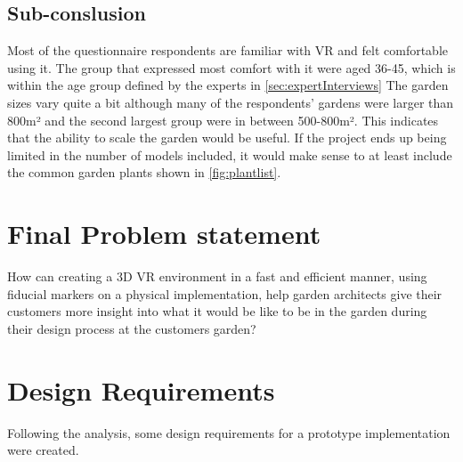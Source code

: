 	\subsection{Sub-conslusion}
	Most of the questionnaire respondents are familiar with VR and felt comfortable using it. The group that expressed most comfort with it were aged 36-45, which is within the age group defined by the experts in \autoref{sec:expertInterviews}
	The garden sizes vary quite a bit although many of the respondents' gardens were larger than 800m² and the second largest group were in between 500-800m². This indicates that the ability to scale the garden would be useful. If the project ends up being limited in the number of models included, it would make sense to at least include the common garden plants shown in \autoref{fig:plantlist}.

\section{Final Problem statement}\label{sec:FPS}
How can creating a 3D VR environment in a fast and efficient manner, using fiducial markers on a physical implementation, help garden architects give their customers more insight into what it would be like to be in the garden during their design process at the customers garden?
			
			\section{Design Requirements}\label{sec:designRequirements}
			Following the analysis, some design requirements for a prototype implementation were created.
